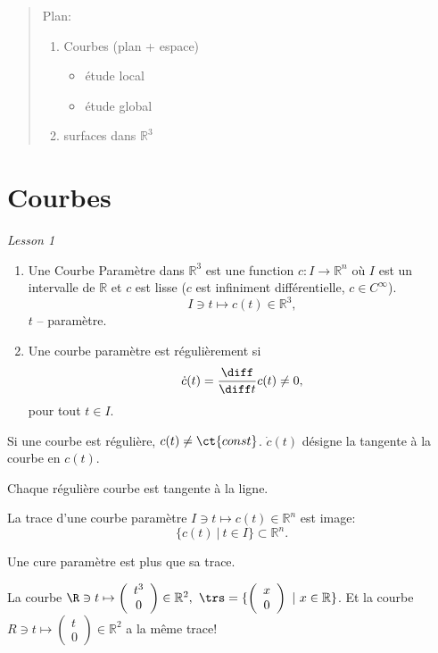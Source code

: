 \tableofcontents

\begin{abstract}
	Plan:
	\begin{enumerate}
		\item Courbes (plan + espace)
		\begin{itemize}
			\item étude local
			\item étude global
		\end{itemize}
		\item surfaces dans $\mathbb{R}^3$
	\end{enumerate}
\end{abstract}
 
	\section{Courbes}

	\emph{Lesson 1}

	\theoremstyle{definition}
	\begin{definition}
		\leavevmode
		\begin{enumerate}
			\item Une Courbe Paramètre dans $\mathbb{R}^3$ est une function $c:I\rightarrow \mathbb{R}^n$ où $I$ est un intervalle de $\mathbb{R}$ et $c$ est lisse ($c$ est infiniment différentielle, $ c \in C^\infty$).
			$$I\ni t\mapsto c(t)\in \mathbb{R}^3,$$
			$t$ -- paramètre.
			\item Une courbe paramètre est régulièrement si
			$$\dot{c}(t) = \frac{\diff}{\diff t}c(t)\neq 0,$$
			pour tout $t\in I$.
		\end{enumerate}
	\end{definition}

	Si une courbe est régulière, $c(t)\neq \ct{const}$. $\dot{c}(t)$ désigne la tangente à la courbe en $c(t)$.

	Chaque régulière courbe est tangente à la ligne.

	\begin{definition} La trace d'une courbe paramètre $I\ni t \mapsto c(t)\in \mathbb{R}^n$ est image:
		$$\{c(t)\ |\ t\in I\} \subset \mathbb{R}^n.$$
	\end{definition}

	Une cure paramètre est plus que sa trace.

	La courbe $\R\ni t \mapsto \left( \begin{array}{c} t^3 \\ 0 \end{array} \right) \in \mathbb{R}^2,$
	$\trs = \{ \left( \begin{array}{c} x \\ 0 \end{array} \right)\ |\ x\in \mathbb{R} \}$. Et la courbe $R\ni t \mapsto \left( \begin{array}{c} t \\ 0 \end{array} \right) \in \mathbb{R}^2$ a la même trace!

